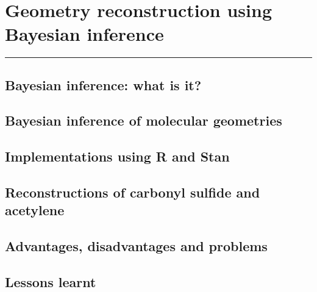 \chapter{Geometry reconstruction using Bayesian inference}\label{ch:bayesian}

\vspace{-1.5 em}
\begin{addmargin}[-0.5cm]{0cm}
  \minitoc
\end{addmargin}
\hrule
\vspace{1.5 em}

\section{Bayesian inference: what is it?}

\section{Bayesian inference of molecular geometries}

\section{Implementations using R and Stan}

\section{Reconstructions of carbonyl sulfide and acetylene}

\section{Advantages, disadvantages and problems}

\section{Lessons learnt}